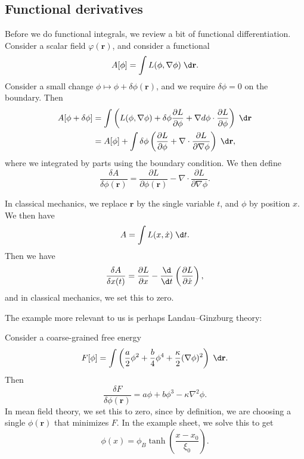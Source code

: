 \documentclass[a4paper]{article}
\begin{document}
\subsection{Functional derivatives}
Before we do functional integrals, we review a bit of functional differentiation. Consider a scalar field $\varphi(\mathbf{r})$, and consider a functional
\[
  A[\phi] = \int L(\phi, \nabla \phi)\;\d \mathbf{r}.
\]
Consider a small change $\phi \mapsto \phi + \delta \phi(\mathbf{r})$, and we require $\delta \phi = 0$ on the boundary. Then
\begin{align*}
  A[\phi + \delta \phi] &= \int \left(L(\phi, \nabla \phi) + \delta \phi \frac{\partial L}{\partial \phi} + \nabla d \phi \cdot \frac{\partial L}{\partial \phi}\right)\;\d \mathbf{r}\\
  &= A[\phi] + \int \delta \phi \left(\frac{\partial L}{\partial \phi} + \nabla \cdot \frac{\partial L}{\partial \nabla \phi}\right)\;\d \mathbf{r},
\end{align*}
where we integrated by parts using the boundary condition. We then define
\[
  \frac{\delta A}{\delta \phi(\mathbf{r})} = \frac{\partial L}{\partial \phi(\mathbf{r})} - \nabla \cdot \frac{\partial L}{\partial \nabla \phi}.
\]
\begin{eg}
  In classical mechanics, we replace $\mathbf{r}$ by the single variable $t$, and $\phi$ by position $x$. We then have
  \[
    A = \int L(x, \dot{x})\;\d t.
  \]
  Then we have
  \[
    \frac{\delta A}{\delta x(t)} = \frac{\partial L}{\partial x} - \frac{\d}{\d t} \left(\frac{\partial L}{\partial \dot{x}}\right),
  \]
  and in classical mechanics, we set this to zero.
\end{eg}

The example more relevant to us is perhaps Landau--Ginzburg theory:
\begin{eg}
  Consider a coarse-grained free energy
  \[
    F[\phi] = \int \left(\frac{a}{2} \phi^2 + \frac{b}{4} \phi^4 + \frac{\kappa}{2} (\nabla \phi)^2 \right)\;\d \mathbf{r}.
  \]
  Then
  \[
    \frac{\delta F}{\delta \phi(\mathbf{r})} = a \phi + b \phi^3 - \kappa \nabla^2 \phi.
  \]
  In mean field theory, we set this to zero, since by definition, we are choosing a single $\phi(\mathbf{r})$ that minimizes $F$. In the example sheet, we solve this to get
  \[
    \phi(x) = \phi_B \tanh \left(\frac{x - x_0}{\xi_0}\right).
  \]
\end{eg}
\end{document}
